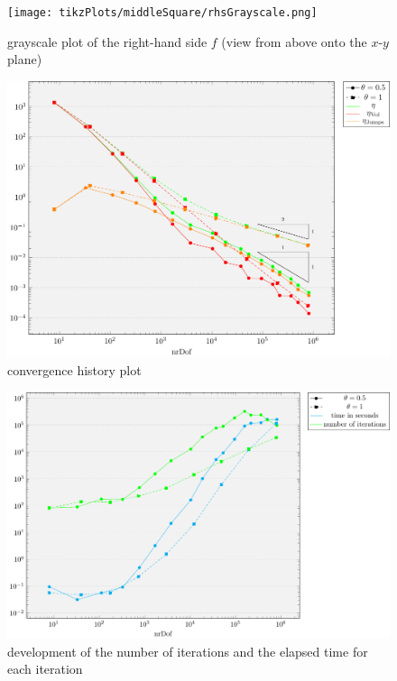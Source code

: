 \documentclass[draft=false,twoside,12pt]{scrreprt}
\begin{document}
\begin{figure}[H]
	\centering
	\texttt{[image: tikzPlots/middleSquare/rhsGrayscale.png]}
  \caption{grayscale plot of the right-hand side $f$ (view from above onto the
  $x$-$y$ plane)}
  \label{fig:rhsMiddleSquare}
\end{figure}

\begin{figure}[H]
	\centering
	\includegraphics[width=16cm]
  {tikzPlots/middleSquare/convergence.pdf}
  \caption{convergence history plot}
\end{figure}

\begin{figure}[H]
	\centering
	\includegraphics[width=16cm]{tikzPlots/middleSquare/misc.pdf}
  \caption{development of the number of iterations and the elapsed time for 
  each iteration}
\end{figure}
\end{document}

